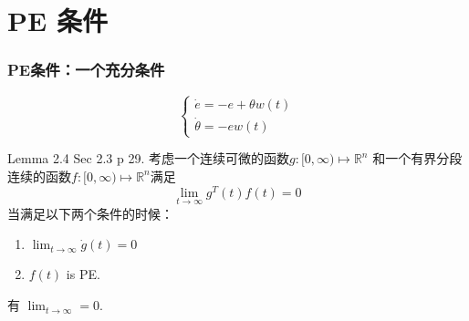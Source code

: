 \section{PE 条件}

\begin{frame}
    \frametitle{PE条件：一个充分条件}

    \[
    \begin{cases}
    \dot{e} = -e + \theta w(t) \\
    \dot{\theta} = -e w(t)
    \end{cases}
    \]

    \begin{lemma}
        Lemma 2.4 \cite{Chen2015} Sec 2.3 p 29.
        考虑一个连续可微的函数$g:[0,\infty)\mapsto \mathbb{R}^n$ 和一个有界分段连续的函数$f:[0,\infty)\mapsto \mathbb{R}^n$满足
        \[\lim_{t\to\infty} g^T(t)f(t)=0\]
        当满足以下两个条件的时候：
        \begin{enumerate}
            \item $\lim_{t\to\infty} \dot{g}(t)=0$
            \item $f(t)$ is PE.
        \end{enumerate}
        有 $\lim_{t\to\infty}=0$.
    \end{lemma}
\end{frame}